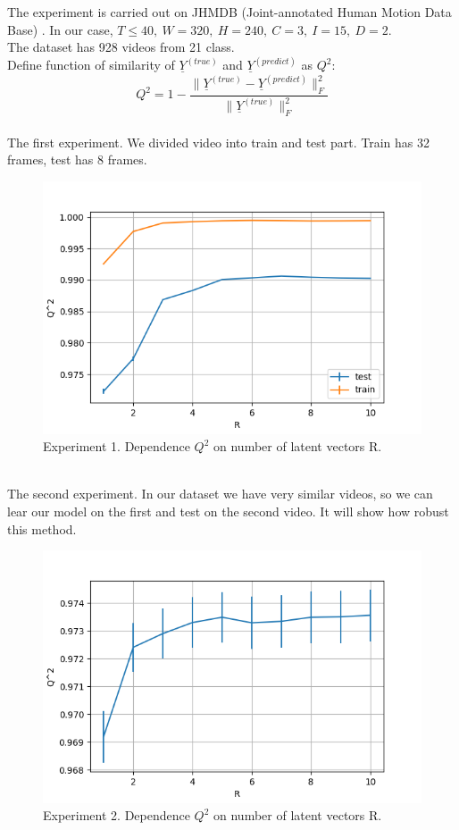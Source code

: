 \documentclass[../../main.tex]{subfiles}
\begin{document}
The experiment is carried out on JHMDB (Joint-annotated Human Motion Data Base) \cite{Jhuang:ICCV:2013}.
In our case, $T \leqslant 40, ~W = 320, ~H = 240, ~C = 3, ~I = 15, ~D = 2.$\\
The dataset has 928 videos from 21 class.
\\
Define function of similarity of $\underline{Y}^{(true)}$ and $\underline{Y}^{(predict)}$ as
$Q^2$:
$$Q^2 = 1 - \frac{\|\underline{Y}^{(true)} - \underline{Y}^{(predict)}\|_F^2}{\|\underline{Y}^{(true)}\|_F^2}$$
\\
The first experiment. We divided video into train and test part. Train has 32 frames, test has 8 frames. 
\\
\begin{figure}[h!]
\centering
\includegraphics[width=1\textwidth]{figures/fig1}
\caption{Experiment 1. Dependence $Q^2$ on number of latent vectors R.}
\end{figure}
\\
The second experiment. In our dataset we have very similar videos, so we can lear our model on the first and test on the second video. It will show how robust this method.
\\
\begin{figure}[h!]
\centering
\includegraphics[width=1\textwidth]{figures/fig2}
\caption{Experiment 2. Dependence $Q^2$ on number of latent vectors R.}
\end{figure}
\end{document}
